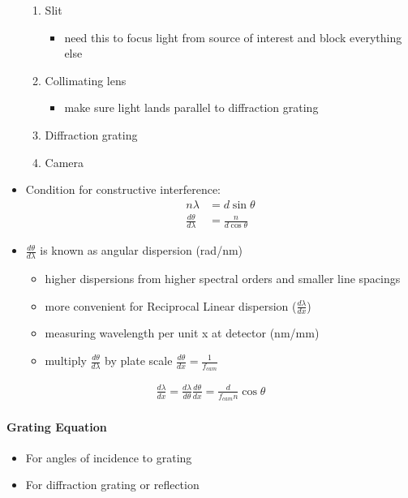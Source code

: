 \documentclass[a4paper,11pt,normalem]{article}
\begin{document}
\begin{itemize}
        \begin{enumerate}
            \item Slit
                \begin{itemize}
                    \item need this to focus light from source of interest and block everything else
                \end{itemize}
            \item Collimating lens
                \begin{itemize}
                    \item make sure light lands parallel to diffraction grating
                \end{itemize}
            \item Diffraction grating
            \item Camera
        \end{enumerate}
    \item Condition for constructive interference:
        \begin{align*}
            n\lambda &= d\sin\theta \\
            \frac{d\theta}{d\lambda} &= \frac{n}{d\cos\theta}
        \end{align*}
    \item \(\frac{d\theta}{d\lambda}\) is known as angular dispersion (rad/nm)
        \begin{itemize}
            \item higher dispersions from higher spectral orders and smaller line spacings
            \item more convenient for Reciprocal Linear dispersion (\(\frac{d\lambda}{dx}\))
            \item measuring wavelength per unit x at detector (nm/mm)
            \item multiply \(\frac{d\theta}{d\lambda}\) by plate scale \(\frac{d\theta}{dx} = \frac{1}{f_{cam}}\)
        \end{itemize}
\end{itemize}
\begin{align*}
    \frac{d\lambda}{dx} = \frac{d\lambda}{d\theta}\frac{d\theta}{dx} = \frac{d}{f_{cam}n}\cos\theta
\end{align*}

\paragraph{Grating Equation}
\begin{itemize}
    \item For angles of incidence to grating
    \item For diffraction grating or reflection
\end{itemize}
\end{document}
